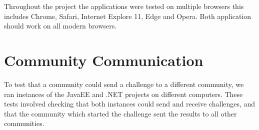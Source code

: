Throughout the project the applications were tested on multiple browsers this includes Chrome, Safari, Internet Explore 11, Edge and Opera. Both application should work on all modern browsers.

\section{Community Communication}

To test that a community could send a challenge to a different community, we ran instances of the JavaEE and .NET projects on different computers. These tests involved checking that both instances could send and receive challenges, and that the community which started the challenge sent the results to all other communities.


